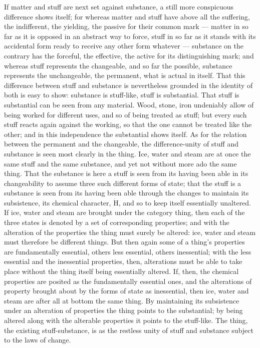 \documentclass[12pt,a4paper]{book}
\begin{document}
If matter and stuff are next set against substance, a still more conspicuous
difference shows itself; for whereas matter and stuff have above all the
suffering, the indifferent, the yielding, the passive for their common mark ---
matter in so far as it is opposed in an abstract way to force, stuff in so far
as it stands with its accidental form ready to receive any other form whatever
--- substance on the contrary has the forceful, the effective, the active for
its distinguishing mark; and whereas stuff represents the changeable, and so
far the possible, substance represents the unchangeable, the permanent, what is
actual in itself. That this difference between stuff and substance is
nevertheless grounded in the identity of both is easy to show: substance is
stuff-like, stuff is substantial. That stuff is substantial can be seen from
any material. Wood, stone, iron undeniably allow of being worked for different
uses, and so of being treated as stuff; but every such stuff reacts again
against the working, so that the one cannot be treated like the other; and in
this independence the substantial shows itself. As for the relation between the
permanent and the changeable, the difference-unity of stuff and substance is
seen most clearly in the thing. Ice, water and steam are at once the same stuff
and the same substance, and yet not without more ado the same thing. That the
substance is here a stuff is seen from its having been able in its
changeability to assume three such different forms of state; that the stuff is
a substance is seen from its having been able through the changes to maintain
its subsistence, its chemical character,
$\dot{\mathrm{H}}$, and so to keep itself essentially unaltered. If ice, water
and steam are brought under the category thing, then each of the three states
is denoted by a set of corresponding properties; and with the alteration of the
properties the thing must
surely be altered: ice, water and steam must therefore be different things. But
then again some of a thing's properties are fundamentally essential, others
less essential, others inessential; with the less essential and the inessential
properties, then, alterations must be able to take place without the thing
itself being essentially altered. If, then, the chemical properties are posited
as the fundamentally essential ones, and the alterations of property brought
about by the forms of state as inessential, then ice, water and steam are after
all at bottom the same thing. By maintaining its subsistence under an
alteration of properties the thing points to the substantial; by being altered
along with the alterable properties it points to the stuff-like. The thing, the
existing stuff-substance, is as the restless unity of stuff and substance
subject to the laws of change.
\end{document}
